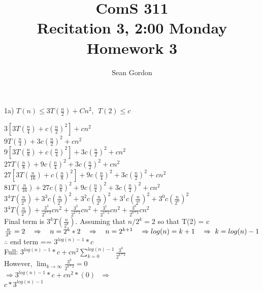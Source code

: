 \documentclass[12pt]{article}
\title{ComS 311\\Recitation 3, 2:00 Monday\\Homework 3}
\author{Sean Gordon}
\begin{document}
\maketitle


\noindent 1a) $T(n) \le 3T(\frac{n}{2}) + Cn^2,\ \ T(2) \le c$\\

\begin{adjustwidth}{.25in}{0in}

$3[3T(\frac{n}{4})+c(\frac{n}{2})^2] + cn^2$\\
$9T(\frac{n}{4})+3c(\frac{n}{2})^2 + cn^2$\\

\noindent
$9[3T(\frac{n}{8})+c(\frac{n}{4})^2]+
3c(\frac{n}{2})^2 + cn^2$\\
\noindent
$27T(\frac{n}{8})+9c(\frac{n}{4})^2+
3c(\frac{n}{2})^2 + cn^2$\\


\noindent
$27[3T(\frac{n}{16})+c(\frac{n}{8})^2]+
9c(\frac{n}{4})^2+
3c(\frac{n}{2})^2 + cn^2$\\
\noindent
$81T(\frac{n}{16})+27c(\frac{n}{8})^2+
9c(\frac{n}{4})^2+
3c(\frac{n}{2})^2 + cn^2$\\


\noindent
$3^4T(\frac{n}{2^4}) + 
3^3c(\frac{n}{2^3})^2 + 
3^2c(\frac{n}{2^2})^2 + 
3^1c(\frac{n}{2^1})^2 + 
3^0c(\frac{n}{2^0})^2$\\
\noindent
$3^4T(\frac{n}{2^4}) + 
\frac{3^3}{2^{3*2}}cn^2 + 
\frac{3^2}{2^{2*2}}cn^2 + 
\frac{3^1}{2^{1*2}}cn^2 + 
\frac{3^0}{2^{0*2}}cn^2$\\

\noindent Final term is $3^kT(\frac{n}{2^k})$. Assuming that $n/2^k =2$ so that T(2) = c\\
$\frac{n}{2^k}=2\ \ \ \Rightarrow\ \ \ n=2^k*2\ \ \ \Rightarrow\ \ \  n=2^{k+1}\ \ \ \Rightarrow\\
log(n)=k+1\ \ \ \Rightarrow\ k=log(n)-1$\\
\indent $\therefore$ end term == $3^{log(n)-1}*c$\\

\noindent Full: $3^{log(n)-1}*c + cn^2\sum_{k=0}^{log(n)-1} \frac{3^k}{2^{k*2}}$\\
However, $\lim_{k\to\infty} \frac{3^k}{2^{k*2}} = 0$\\
\noindent $\Rightarrow 3^{log(n)-1}*c + cn^2*(0)\ \ \ \Rightarrow$\\
$c*3^{log(n)-1}$

\end{adjustwidth}
\end{document}
